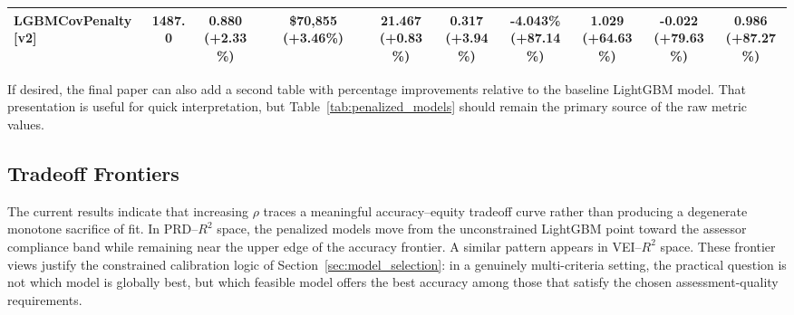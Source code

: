 \documentclass[12pt, draft]{article}
\theoremstyle{plain}
\theoremstyle{definition}
\newcommand{\1}{\mathbf{1}}
\begin{document}
\begin{table}[htbp]
{\begin{tabular}{lc|cc|cc|cccc}
    LGBMCovPenalty [v2] & 1487.0 &
    \makecell{\textbf{0.880}\\{\scriptsize(\textcolor{green!60!black}{+2.33\%})}} &
    \makecell{\textbf{\$70,855}\\{\scriptsize(\textcolor{green!60!black}{+3.46\%})}} &
    \makecell{\textbf{21.467}\\{\scriptsize(\textcolor{green!60!black}{+0.83\%})}} &
    \makecell{\textbf{0.317}\\{\scriptsize(\textcolor{green!60!black}{+3.94\%})}} &
    \makecell{\textbf{-4.043\%}\\{\scriptsize(\textcolor{green!60!black}{+87.14\%})}} &
    \makecell{\textbf{1.029}\\{\scriptsize(\textcolor{green!60!black}{+64.63\%})}} &
    \makecell{\textbf{-0.022}\\{\scriptsize(\textcolor{green!60!black}{+79.63\%})}} &
    \makecell{\textbf{0.986}\\{\scriptsize(\textcolor{green!60!black}{+87.27\%})}} \\
    \bottomrule
    \end{tabular}
    }
\end{table}



If desired, the final paper can also add a second table with percentage improvements relative to the baseline LightGBM model. That presentation is useful for quick interpretation, but Table~\ref{tab:penalized_models} should remain the primary source of the raw metric values.

\subsection{Tradeoff Frontiers}

The current results indicate that increasing \(\rho\) traces a meaningful accuracy--equity tradeoff curve rather than producing a degenerate monotone sacrifice of fit. In PRD--\(R^2\) space, the penalized models move from the unconstrained LightGBM point toward the assessor compliance band while remaining near the upper edge of the accuracy frontier. A similar pattern appears in VEI--\(R^2\) space. These frontier views justify the constrained calibration logic of Section~\ref{sec:model_selection}: in a genuinely multi-criteria setting, the practical question is not which model is globally best, but which feasible model offers the best accuracy among those that satisfy the chosen assessment-quality requirements.
\end{document}
